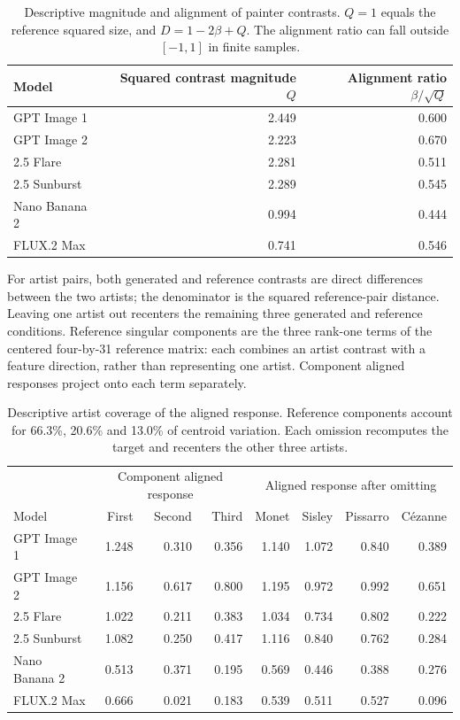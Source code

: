 \begin{table}[htbp]
\caption{Descriptive magnitude and alignment of painter contrasts. $Q=1$ equals the reference squared size, and $D=1-2\beta+Q$. The alignment ratio can fall outside $[-1,1]$ in finite samples.}
\label{tab:review-alignment}
\centering\small
\begin{tabular}{@{}lrr@{}}\toprule
Model & Squared contrast magnitude $Q$ & Alignment ratio $\beta/\sqrt Q$\\
\midrule
GPT Image 1 & 2.449 & 0.600\\
GPT Image 2 & 2.223 & 0.670\\
2.5 Flare & 2.281 & 0.511\\
2.5 Sunburst & 2.289 & 0.545\\
Nano Banana 2 & 0.994 & 0.444\\
FLUX.2 Max & 0.741 & 0.546\\
\bottomrule\end{tabular}

\end{table}


For artist pairs, both generated and reference contrasts are direct differences
between the two artists; the denominator is the squared reference-pair distance.
Leaving one artist out recenters the remaining three generated and reference
conditions. Reference singular components are the three rank-one terms of the
centered four-by-31 reference matrix: each combines an artist contrast with a
feature direction, rather than representing one artist. Component aligned
responses project onto each term separately.

\begin{table}[htbp]
\caption{Descriptive artist coverage of the aligned response. Reference components account for 66.3\%, 20.6\% and 13.0\% of centroid variation. Each omission recomputes the target and recenters the other three artists.}
\label{tab:review-components}
\centering\small
\begin{tabular}{@{}lrrr|rrrr@{}}\toprule
 & \multicolumn{3}{c}{Component aligned response} & \multicolumn{4}{c}{Aligned response after omitting}\\
Model & First & Second & Third & Monet & Sisley & Pissarro & C\'ezanne\\\midrule
GPT Image 1 & 1.248 & 0.310 & 0.356 & 1.140 & 1.072 & 0.840 & 0.389\\
GPT Image 2 & 1.156 & 0.617 & 0.800 & 1.195 & 0.972 & 0.992 & 0.651\\
2.5 Flare & 1.022 & 0.211 & 0.383 & 1.034 & 0.734 & 0.802 & 0.222\\
2.5 Sunburst & 1.082 & 0.250 & 0.417 & 1.116 & 0.840 & 0.762 & 0.284\\
Nano Banana 2 & 0.513 & 0.371 & 0.195 & 0.569 & 0.446 & 0.388 & 0.276\\
FLUX.2 Max & 0.666 & 0.021 & 0.183 & 0.539 & 0.511 & 0.527 & 0.096\\
\bottomrule\end{tabular}

\end{table}


